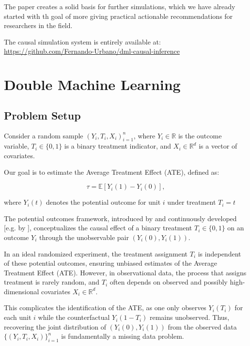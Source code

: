 \documentclass{article}
\numberwithin{equation}{section}
\begin{document}
The paper creates a solid basis for further simulations, which we have already started with th goal of more giving practical actionable recommendations for researchers in the field.

The causal simulation system is entirely available at: \url{https://github.com/Fernando-Urbano/dml-causal-inference}

\newpage
\tableofcontents
\newpage

\section{Double Machine Learning}

\subsection{Problem Setup}

Consider a random sample ${(Y_i, T_i, X_i)}_{i=1}^n$, where $Y_i \in \mathbb{R}$ is the outcome variable, $T_i \in \{0,1\}$ is a binary treatment indicator, and $X_i \in \mathbb{R}^d$ is a vector of covariates.

Our goal is to estimate the Average Treatment Effect (ATE), defined as:

\begin{equation}
\tau = \mathbb{E}[Y_i(1) - Y_i(0)],
\label{eq:tau_hat_potential_outcome}
\end{equation}

where $Y_i(t)$ denotes the potential outcome for unit $i$ under treatment $T_i = t$

The potential outcomes framework, introduced by \cite{Rubin1974} and continuously developed [e.g. by \cite{ImbensRubin2015}], conceptualizes the causal effect of a binary treatment \(T_i \in \{0,1\}\) on an outcome \(Y_i\) through the unobservable pair \((Y_i(0), Y_i(1))\).

In an ideal randomized experiment, the treatment assignment \(T_i\) is independent of these potential outcomes, ensuring unbiased estimates of the Average Treatment Effect (ATE). However, in observational data, the process that assigns treatment is rarely random, and \(T_i\) often depends on observed and possibly high-dimensional covariates \(X_i \in \mathbb{R}^d\).

This complicates the identification of the ATE, as one only observes \(Y_i(T_i)\) for each unit \(i\) while the counterfactual \(Y_i(1-T_i)\) remains unobserved. Thus, recovering the joint distribution of \((Y_i(0), Y_i(1))\) from the observed data \(\{(Y_i, T_i, X_i)\}_{i=1}^n\) is fundamentally a missing data problem.
\end{document}
